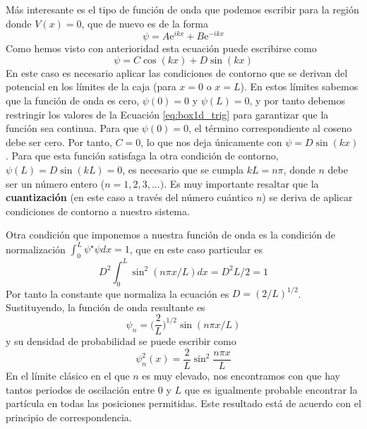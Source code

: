\documentclass{tufte-handout}
\begin{document}
Más interesante es el tipo de función de onda que podemos
escribir para la región donde $V(x)=0$, que de nuevo es de
la forma
\begin{equation}
    \psi=A\mathrm{e}^{ikx} + B\mathrm{e}^{-ikx}
\end{equation}
Como hemos visto con anterioridad esta ecuación puede 
escribirse como 
\begin{equation}
    \psi=C\cos(kx) + D\sin(kx)\label{eq:box1d_trig}
\end{equation}
En este caso es necesario aplicar las condiciones de 
contorno que se derivan del potencial en los límites de
la caja (para $x=0$ o $x=L$). En estos límites sabemos que 
la función de onda es cero, $\psi(0)=0$ y $\psi(L)=0$, y por
tanto debemos restringir los valores de la Ecuación 
\ref{eq:box1d_trig} para garantizar que la función sea 
continua. Para que $\psi(0)=0$, el término correspondiente
al coseno debe ser cero. Por tanto, $C=0$, lo que nos deja
únicamente con  $\psi=D\sin(kx)$. Para que esta función
satisfaga la otra condición de contorno, 
$\psi(L)=D\sin(kL)=0$, es necesario que se cumpla $kL=n\pi$,
donde $n$ debe ser un número entero ($n=1,2,3,...)$. Es
muy importante resaltar que la \textbf{cuantización} 
(en este caso a través del número cuántico $n$) se deriva de
aplicar condiciones de contorno a nuestro sistema.

Otra condición que imponemos a nuestra función de onda es la
condición de normalización 
$\int_0^L\psi^\star \psi dx = 1$, 
que en este caso particular es
\begin{equation}
        D^2\int_0^L\sin^2 (n\pi x/L) dx = D^2L/2= 1
\end{equation}
Por tanto la constante que normaliza la ecuación es
$D=(2/L)^{1/2}$. Sustituyendo, la función de onda
resultante es
\begin{equation}
    \psi_n=\bigg(\frac{2}{L}\bigg)^{1/2}\sin(n\pi x/L)
    \label{eq:box1d}
\end{equation}
y su densidad de probabilidad se puede escribir como
\begin{equation}
    \psi^2_n(x)=\frac{2}{L}\sin^2\frac{n\pi x}{L}
\end{equation}
En el límite clásico en el que $n$ es muy elevado, nos 
encontramos con que hay tantos periodos de oscilación 
entre 0 y $L$ que es igualmente probable encontrar la 
partícula en todas las posiciones permitidas. Este 
resultado está de acuerdo con el principio de 
correspondencia.
\end{document}
